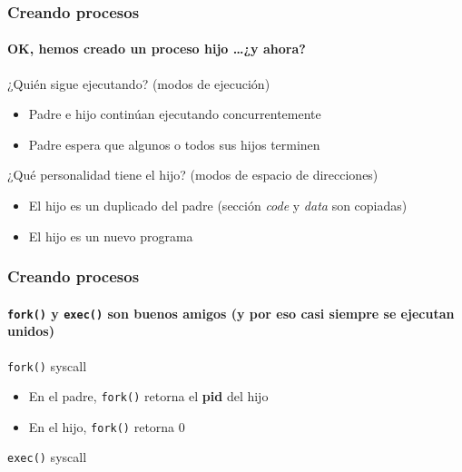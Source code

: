 \documentclass[letter]{beamer}
\begin{document}
\begin{frame}
  \frametitle{Creando procesos}
  \framesubtitle{OK, hemos creado un proceso hijo \ldots ¿y ahora?}

  ¿Quién sigue ejecutando? (modos de ejecución)
  \begin{itemize}
    \item Padre e hijo continúan ejecutando concurrentemente
    \item Padre espera que algunos o todos sus hijos terminen
  \end{itemize}

  ¿Qué personalidad tiene el hijo? (modos de espacio de direcciones)
  \begin{itemize}
    \item El hijo es un duplicado del padre (sección {\em code} y {\em data} son copiadas)
    \item El hijo es un nuevo programa
  \end{itemize}

\end{frame}

\begin{frame}
  \frametitle{Creando procesos}
  \framesubtitle{{\tt fork()} y {\tt exec()} son buenos amigos (y por eso casi siempre se ejecutan unidos)}
  
  \begin{block}{{\tt fork()} syscall}
    
    \begin{itemize}
      \item<4-> En el padre, {\tt fork()} retorna el {\bf pid} del hijo
      \item<4-> En el hijo, {\tt fork()} retorna 0
    \end{itemize}
  \end{block}
  
  \begin{block}{{\tt exec()} syscall}
  \end{block}
\end{frame}
\end{document}
